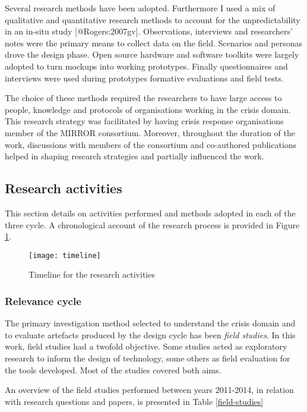 Several research methods have been adopted. Furthermore I used a mix of
qualitative and quantitative research methods to account for the
unpredictability in an in-situ study {[}@Rogers:2007gv{]}. Observations,
interviews and researchers' notes were the primary means to collect data
on the field. Scenarios and personas drove the design phase. Open source
hardware and software toolkits were largely adopted to turn mockups into
working prototypes. Finally questionnaires and interviews were used
during prototypes formative evaluations and field tests.

The choice of these methods required the researchers to have large
access to people, knowledge and protocols of organisations working in
the crisis domain. This research strategy was facilitated by having
crisis response organisations member of the MIRROR consortium. Moreover,
throughout the duration of the work, discussions with members of the
consortium and co-authored publications helped in shaping research
strategies and partially influenced the work.

\subsection{Research activities}\label{research-activities}

This section details on activities performed and methods adopted in each
of the three cycle. A chronological account of the research process is
provided in Figure \ref{fig:research-activities}.

\begin{figure}[tbh]
    \centering
    \texttt{[image: timeline]}
    \caption{Timeline for the research activities}
    \label{fig:research-activities}
\end{figure}

\subsubsection{Relevance cycle}\label{relevance-cycle}

The primary investigation method selected to understand the crisis
domain and to evaluate artefacts produced by the design cycle has been
\emph{field studies}. In this work, field studies had a twofold
objective. Some studies acted as exploratory research to inform the
design of technology, some others as field evaluation for the tools
developed. Most of the studies covered both aims.

An overview of the field studies performed between years 2011-2014, in
relation with research questions and papers, is presented
 in Table
\ref{field-studies}


